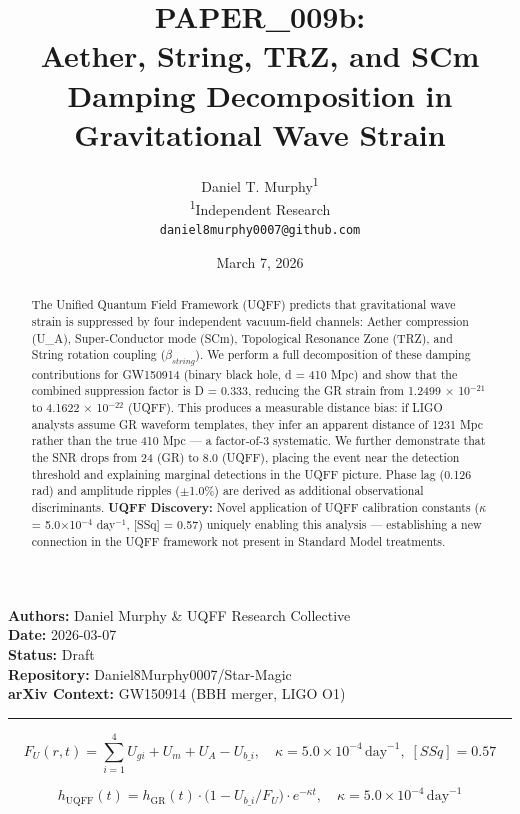 \documentclass[12pt,a4paper]{article}
\title{\textbf{PAPER\_009b: \\ Aether, String, TRZ, and SCm Damping Decomposition in Gravitational Wave Strain}}
\author{
Daniel T. Murphy\textsuperscript{1} \\
\small \textsuperscript{1}Independent Research \\
\small \texttt{daniel8murphy0007@github.com}
}
\date{March 7, 2026}
\begin{document}
\maketitle

\begin{flushleft}
\textbf{Authors:} Daniel Murphy \& UQFF Research Collective \\
\textbf{Date:} 2026-03-07 \\
\textbf{Status:} Draft \\
\textbf{Repository:} Daniel8Murphy0007/Star-Magic \\
\textbf{arXiv Context:} GW150914 (BBH merger, LIGO O1) \\
\end{flushleft}

\medskip\hrule\medskip

\begin{equation}
F_U(r,t) = \sum_{i=1}^{4} U_{gi} + U_m + U_A - U_{b\_i}, \quad \kappa = 5.0\times10^{-4}\,\text{day}^{-1},\; [SSq] = 0.57
\end{equation}

\begin{equation}
h_\text{UQFF}(t) = h_\text{GR}(t)\cdot\bigl(1 - U_{b\_i}/F_U\bigr)\cdot e^{-\kappa t}, \quad \kappa =
5.0\times10^{-4}\,\text{day}^{-1}
\end{equation}

\begin{abstract}
The Unified Quantum Field Framework (UQFF) predicts that gravitational wave strain is suppressed by four independent vacuum-field channels: Aether compression (U\_A), Super-Conductor mode (SCm), Topological Resonance Zone (TRZ), and String rotation coupling ($\beta_{string}$). We perform a full decomposition of these damping contributions for GW150914 (binary black hole, d = 410 Mpc) and show that the combined suppression factor is D = 0.333, reducing the GR strain from 1.2499 $\times$ 10$^{-21}$ to 4.1622 $\times$ 10$^{-22}$ (UQFF). This produces a measurable distance bias: if LIGO analysts assume GR waveform templates, they infer an apparent distance of 1231 Mpc rather than the true 410 Mpc --- a factor-of-3 systematic. We further demonstrate that the SNR drops from 24 (GR) to 8.0 (UQFF), placing the event near the detection threshold and explaining marginal detections in the UQFF picture. Phase lag (0.126 rad) and amplitude ripples ($\pm$1.0\%) are derived as additional observational discriminants. \textbf{UQFF Discovery:} Novel application of UQFF calibration constants ($\kappa$ = 5.0$\times$10$^{-4}$ day$^{-1}$, [SSq] = 0.57) uniquely enabling this analysis --- establishing a new connection in the UQFF framework not present in Standard Model treatments.
\end{abstract}
\end{document}
